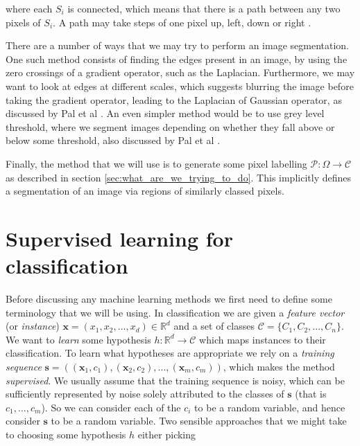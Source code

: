 \documentclass[12pt,twoside,notitlepage]{report}
\newcommand{\vc}[1]{\mathbf{#1}}
\newcommand{\cl}[1]{\mathcal{#1}}
\newcommand{\bb}[1]{\mathbb{#1}}
\begin{document}
        where each $S_i$ is connected, which means that there is a path between any two pixels of $S_i$. 
        A path may take steps of one pixel up, left, down or right \cite{PAL19931277}. 

        There are a number of ways that we may try to perform an image segmentation. One such method consists of 
        finding the edges present in an image, by using the zero crossings of a gradient operator, 
        such as the Laplacian. Furthermore, we may want to look at edges at different scales, which suggests blurring 
        the image before taking the gradient operator, leading to the Laplacian of Gaussian operator, as discussed by 
        Pal et al \cite{PAL19931277}. An even simpler method would be to use grey level threshold, where we segment 
        images depending on whether they fall above or below some threshold, also discussed by Pal et al \cite{PAL19931277}.

        Finally, the method that we will use is to generate some pixel labelling $\cl{P}:\Omega \rightarrow \cl{C}$ as 
        described in section \ref{sec:what_are_we_trying_to_do}. This implicitly defines a segmentation of an image 
        via regions of similarly classed pixels.




    \section{Supervised learning for classification} \label{sec:supervised_learning}
        Before discussing any machine learning methods we first need to define some terminology that we will be using. 
        In classification we are given a \textit{feature vector} (or \textit{instance}) $\vc{x} = (x_1, x_2, ..., x_d) 
        \in \bb{R}^d$ and a set of classes $\cl{C} = \{C_1, C_2, ..., C_n\}$. We want to \textit{learn} some 
        hypothesis $h:\bb{R}^d \rightarrow \cl{C}$ which maps instances to their classification. To learn 
        what hypotheses are appropriate we rely on a \textit{training sequence} $\vc{s} = ((\vc{x}_1, c_1), 
        (\vc{x}_2, c_2), ..., (\vc{x}_m, c_m))$, which makes the method \textit{supervised}. We usually assume that 
        the training sequence is noisy, which can be sufficiently represented by noise solely attributed to the classes of $\vc{s}$ 
        (that is $c_1, ..., c_m$). So we can consider each of the $c_i$ to be a random variable, and hence consider 
        $\vc{s}$ to be a random variable. Two sensible approaches that we might take to choosing some hypothesis $h$ 
        either picking
\end{document}
